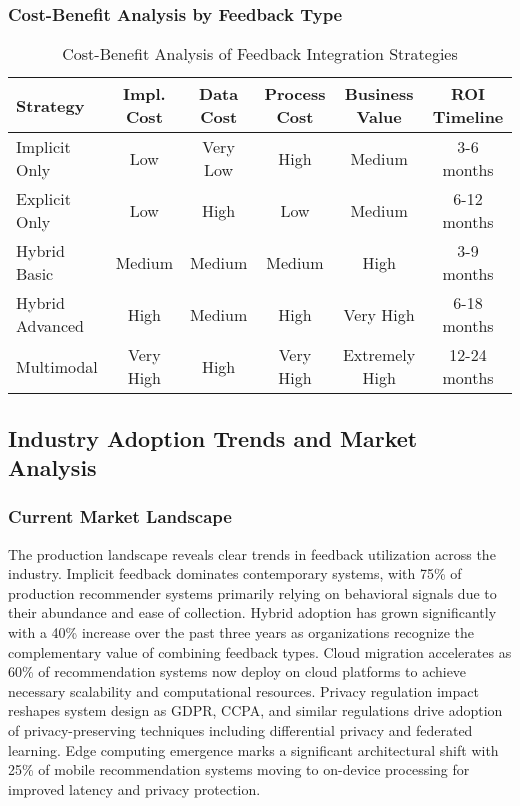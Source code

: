 \subsubsection{Cost-Benefit Analysis by Feedback Type}

\begin{table}[h]
\centering
\caption{Cost-Benefit Analysis of Feedback Integration Strategies}
\label{tab:cost_benefit}
\scriptsize
\begin{tabular}{@{}lccccc@{}}
\toprule
Strategy & Impl. Cost & Data Cost & Process Cost & Business Value & ROI Timeline \\
\midrule
Implicit Only & Low & Very Low & High & Medium & 3-6 months \\
Explicit Only & Low & High & Low & Medium & 6-12 months \\
Hybrid Basic & Medium & Medium & Medium & High & 3-9 months \\
Hybrid Advanced & High & Medium & High & Very High & 6-18 months \\
Multimodal & Very High & High & Very High & Extremely High & 12-24 months \\
\bottomrule
\end{tabular}
\end{table}

\subsection{Industry Adoption Trends and Market Analysis}

\subsubsection{Current Market Landscape}

The production landscape reveals clear trends in feedback utilization across the industry. Implicit feedback dominates contemporary systems, with 75\% of production recommender systems primarily relying on behavioral signals due to their abundance and ease of collection. Hybrid adoption has grown significantly with a 40\% increase over the past three years as organizations recognize the complementary value of combining feedback types. Cloud migration accelerates as 60\% of recommendation systems now deploy on cloud platforms to achieve necessary scalability and computational resources. Privacy regulation impact reshapes system design as GDPR, CCPA, and similar regulations drive adoption of privacy-preserving techniques including differential privacy and federated learning. Edge computing emergence marks a significant architectural shift with 25\% of mobile recommendation systems moving to on-device processing for improved latency and privacy protection.

